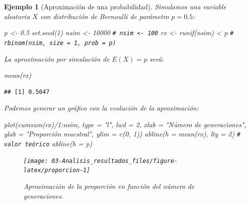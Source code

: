 \documentclass[
]{book}
\newenvironment{Shaded}{\begin{snugshade}}{\end{snugshade}}
\newcommand{\AttributeTok}[1]{\textcolor[rgb]{0.77,0.63,0.00}{#1}}
\newcommand{\CommentTok}[1]{\textcolor[rgb]{0.56,0.35,0.01}{\textit{#1}}}
\newcommand{\DecValTok}[1]{\textcolor[rgb]{0.00,0.00,0.81}{#1}}
\newcommand{\FloatTok}[1]{\textcolor[rgb]{0.00,0.00,0.81}{#1}}
\newcommand{\FunctionTok}[1]{\textcolor[rgb]{0.00,0.00,0.00}{#1}}
\newcommand{\NormalTok}[1]{#1}
\newcommand{\OtherTok}[1]{\textcolor[rgb]{0.56,0.35,0.01}{#1}}
\newcommand{\SpecialCharTok}[1]{\textcolor[rgb]{0.00,0.00,0.00}{#1}}
\newcommand{\StringTok}[1]{\textcolor[rgb]{0.31,0.60,0.02}{#1}}
\theoremstyle{break}
\newtheorem{example}{Ejemplo}[chapter]
\theoremstyle{nonumberplain}
\renewcommand{\CommentTok}[1]{\textcolor[rgb]{0.41,0.41,0.41}{\texttt{#1}}}
\begin{document}
\begin{example}[Aproximación de una probabilidad]

Simulamos una variable aleatoria \(X\) con distribución de Bernoulli de parámetro \(p=0.5\):

\begin{Shaded}
\begin{Highlighting}[]
\NormalTok{p }\OtherTok{\textless{}{-}} \FloatTok{0.5}
\FunctionTok{set.seed}\NormalTok{(}\DecValTok{1}\NormalTok{)}
\NormalTok{nsim }\OtherTok{\textless{}{-}} \DecValTok{10000} \CommentTok{\# nsim \textless{}{-} 100}
\NormalTok{rx }\OtherTok{\textless{}{-}} \FunctionTok{runif}\NormalTok{(nsim) }\SpecialCharTok{\textless{}}\NormalTok{ p }\CommentTok{\# rbinom(nsim, size = 1, prob = p)}
\end{Highlighting}
\end{Shaded}

La aproximación por simulación de \(E(X) = p\) será:

\begin{Shaded}
\begin{Highlighting}[]
\FunctionTok{mean}\NormalTok{(rx) }
\end{Highlighting}
\end{Shaded}

\begin{verbatim}
## [1] 0.5047
\end{verbatim}

Podemos generar un gráfico con la evolución de la aproximación:

\begin{Shaded}
\begin{Highlighting}[]
\FunctionTok{plot}\NormalTok{(}\FunctionTok{cumsum}\NormalTok{(rx)}\SpecialCharTok{/}\DecValTok{1}\SpecialCharTok{:}\NormalTok{nsim, }\AttributeTok{type =} \StringTok{"l"}\NormalTok{, }\AttributeTok{lwd =} \DecValTok{2}\NormalTok{, }\AttributeTok{xlab =} \StringTok{"Número de generaciones"}\NormalTok{, }
     \AttributeTok{ylab =} \StringTok{"Proporción muestral"}\NormalTok{, }\AttributeTok{ylim =} \FunctionTok{c}\NormalTok{(}\DecValTok{0}\NormalTok{, }\DecValTok{1}\NormalTok{))}
\FunctionTok{abline}\NormalTok{(}\AttributeTok{h =} \FunctionTok{mean}\NormalTok{(rx), }\AttributeTok{lty =} \DecValTok{2}\NormalTok{)}
\CommentTok{\# valor teórico}
\FunctionTok{abline}\NormalTok{(}\AttributeTok{h =}\NormalTok{ p) }
\end{Highlighting}
\end{Shaded}

\begin{figure}[!htb]

{\centering \texttt{[image: 03-Analisis\_resultados\_files/figure-latex/proporcion-1]} 

}

\caption{Aproximación de la proporción en función del número de generaciones.}\label{fig:proporcion}
\end{figure}

\end{example}
\end{document}
